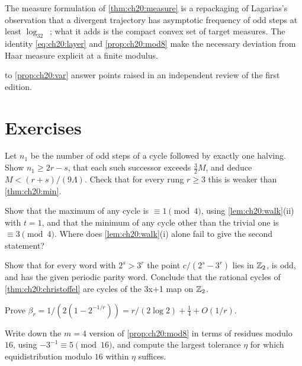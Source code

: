 The measure formulation of \cref{thm:ch20:measure} is a repackaging of Lagarias's observation that a divergent trajectory has asymptotic frequency of odd steps at least $\log_32$~\cite{lagarias1985}; what it adds is the compact convex set of target measures. The identity \eqref{eq:ch20:layer} and \cref{prop:ch20:mod8} make the necessary deviation from Haar measure explicit at a finite modulus.

 to \cref{prop:ch20:var} answer points raised in an independent review of the first edition.

\section*{Exercises}

\begin{exercise}\label{ex:ch20:run}
Let $n_1$ be the number of odd steps of a cycle followed by exactly one halving. Show $n_1\ge2r-s$, that each such successor exceeds $\frac32M$, and deduce $M<(r+s)/(9\Lambda)$. Check that for every rung $r\ge3$ this is weaker than \cref{thm:ch20:min}.
\end{exercise}

\begin{exercise}
Show that the maximum of any cycle is $\equiv1\pmod4$, using \cref{lem:ch20:walk}(ii) with $t=1$, and that the minimum of any cycle other than the trivial one is $\equiv3\pmod4$. Where does \cref{lem:ch20:walk}(i) alone fail to give the second statement?
\end{exercise}

\begin{exercise}\label{ex:ch20:rational}
Show that for every word with $2^s>3^r$ the point $c/(2^s-3^r)$ lies in $\mathbb{Z}_2$, is odd, and has the given periodic parity word. Conclude that the rational cycles of \cref{thm:ch20:christoffel} are cycles of the 3x+1 map on $\mathbb{Z}_2$.
\end{exercise}

\begin{exercise}
Prove $\beta_r=1/(2(1-2^{-1/r}))=r/(2\log2)+\frac14+O(1/r)$.
\end{exercise}

\begin{exercise}
Write down the $m=4$ version of \cref{prop:ch20:mod8} in terms of residues modulo $16$, using $-3^{-1}\equiv5\pmod{16}$, and compute the largest tolerance $\eta$ for which equidistribution modulo $16$ within $\eta$ suffices.
\end{exercise}

